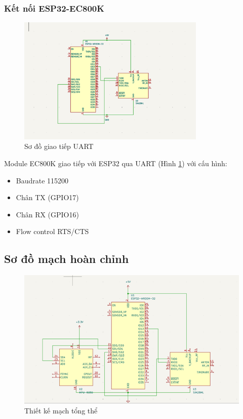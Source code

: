 \documentclass[a4paper,12pt]{report}
\begin{document}
	\subsubsection{Kết nối ESP32-EC800K}
	\begin{figure}[H]
		\centering
		\includegraphics[width=0.8\textwidth]{ESP32_QUECTEL_EC800.png}
		\caption{Sơ đồ giao tiếp UART}
		\label{fig:uart_connection}
	\end{figure}
	
	Module EC800K giao tiếp với ESP32 qua UART (Hình \ref{fig:uart_connection}) với cấu hình:
	\begin{itemize}
		\item Baudrate 115200
		\item Chân TX (GPIO17)
		\item Chân RX (GPIO16)
		\item Flow control RTS/CTS
	\end{itemize}
	
	\subsection{Sơ đồ mạch hoàn chỉnh}
	\begin{figure}[H]
		\centering
		\includegraphics[width=\textwidth]{FULL_SCHEMATIC.png}
		\caption{Thiết kế mạch tổng thể}
		\label{fig:full_design}
	\end{figure}
	
\end{document}
